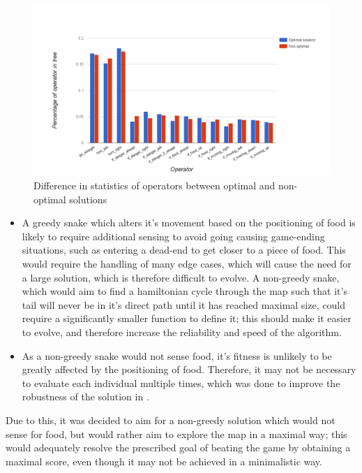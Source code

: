 \documentclass[british,10pt,a4paper]{article}
\begin{document}
\begin{figure}
\centering
	\includegraphics[width=\textwidth,keepaspectratio]{images/operator_prob.png}
	\caption{Difference in statistics of operators between optimal and non-optimal solutions}
	\label{fig:operator_prob}
\end{figure}

\begin{itemize}
	\item A greedy snake which alters it's movement based on the positioning of food is likely to require additional sensing to avoid going causing game-ending situations, such as entering a dead-end to get closer to a piece of food. This would require the handling of many edge cases, which will cause the need for a large solution, which is therefore difficult to evolve. A non-greedy snake, which would aim to find a hamiltonian cycle through the map such that it's tail will never be in it's direct path until it has reached maximal size, could require a significantly smaller function to define it; this should make it easier to evolve, and therefore increase the reliability and speed of the algorithm.
	\item As a non-greedy snake would not sense food, it's fitness is unlikely to be greatly affected by the positioning of food. Therefore, it may not be necessary to evaluate each individual multiple times, which was done to improve the robustness of the solution in \cite{Ehlis2000-sz}.
\end{itemize}
Due to this, it was decided to aim for a non-greedy solution which would not sense for food, but would rather aim to explore the map in a maximal way; this would adequately resolve the prescribed goal of beating the game by obtaining a maximal score, even though it may not be achieved in a minimalistic way.
\end{document}
